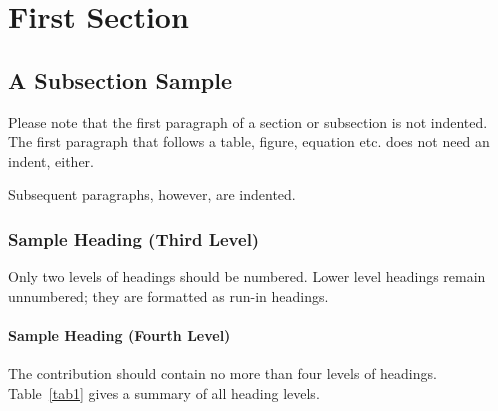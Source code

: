 \documentclass[runningheads]{llncs}
\begin{document}



\vspace{1cm}
\vspace{1cm}




\section{First Section}
\subsection{A Subsection Sample}
Please note that the first paragraph of a section or subsection is
not indented. The first paragraph that follows a table, figure,
equation etc. does not need an indent, either.

Subsequent paragraphs, however, are indented.

\subsubsection{Sample Heading (Third Level)} Only two levels of
headings should be numbered. Lower level headings remain unnumbered;
they are formatted as run-in headings.

\paragraph{Sample Heading (Fourth Level)}
The contribution should contain no more than four levels of
headings. Table~\ref{tab1} gives a summary of all heading levels.
\end{document}
